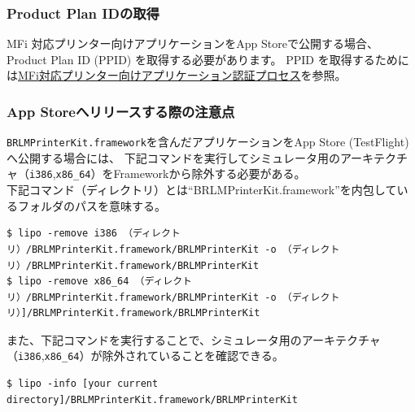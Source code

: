 \documentclass[a4paper]{ltjsreport}
\newcommand{\link}[2]{\href{#2}{#1}}
\newcommand{\terlogy}[2][|]{\colorbox{terlogy}{\texttt{\lstinline#1#2#1}}}
\begin{document}
\subsubsection{Product Plan IDの取得}
MFi 対応プリンター向けアプリケーションをApp Storeで公開する場合、Product Plan ID (PPID) を取得する必要があります。 PPID を取得するためには\link{MFi対応プリンター向けアプリケーション認証プロセス}{https://online.brother.co.jp/dev/MFiTop.aspx}を参照。
\subsubsection{App Storeへリリースする際の注意点}
\texttt{BRLMPrinterKit.framework}を含んだアプリケーションをApp Store (TestFlight)へ公開する場合には、 下記コマンドを実行してシミュレータ用のアーキテクチャ（\terlogy{i386},\terlogy{x86_64}）をFrameworkから除外する必要がある。\\
下記コマンド（ディレクトリ）とは``BRLMPrinterKit.framework''を内包しているフォルダのパスを意味する。
\begin{lstlisting}
$ lipo -remove i386 （ディレクトリ）/BRLMPrinterKit.framework/BRLMPrinterKit -o （ディレクトリ）/BRLMPrinterKit.framework/BRLMPrinterKit
$ lipo -remove x86_64 （ディレクトリ）/BRLMPrinterKit.framework/BRLMPrinterKit -o （ディレクトリ）]/BRLMPrinterKit.framework/BRLMPrinterKit
  \end{lstlisting}
また、下記コマンドを実行することで、シミュレータ用のアーキテクチャ（\terlogy{i386},\terlogy{x86_64}）が除外されていることを確認できる。
\begin{lstlisting}
$ lipo -info [your current directory]/BRLMPrinterKit.framework/BRLMPrinterKit
  \end{lstlisting}
\end{document}

